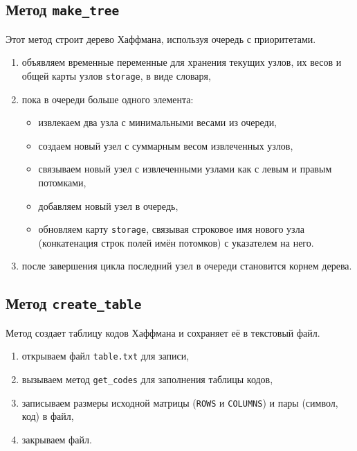 \subsection{Метод \texttt{make\_tree}}
Этот метод строит дерево Хаффмана, используя очередь с приоритетами.
\begin{enumerate}
	\item объявляем временные переменные для хранения текущих узлов, их весов и общей карты узлов \texttt{storage}, в виде словаря,
	\item пока в очереди больше одного элемента:
	\begin{itemize}
		\item извлекаем два узла с минимальными весами из очереди,
		\item создаем новый узел с суммарным весом извлеченных узлов,
		\item связываем новый узел с извлеченными узлами как с левым и правым потомками,
		\item добавляем новый узел в очередь,
		\item обновляем карту \texttt{storage}, связывая строковое имя нового узла (конкатенация строк полей имён потомков) с указателем на него.
	\end{itemize}
	\item после завершения цикла последний узел в очереди становится корнем дерева.
\end{enumerate}

\subsection{Метод \texttt{create\_table}}
Метод создает таблицу кодов Хаффмана и сохраняет её в текстовый файл.
\begin{enumerate}
	\item открываем файл \texttt{table.txt} для записи,
	\item вызываем метод \texttt{get\_codes} для заполнения таблицы кодов,
	\item записываем размеры исходной матрицы (\texttt{ROWS} и \texttt{COLUMNS}) и пары (символ, код) в файл,
	\item закрываем файл.
\end{enumerate}

